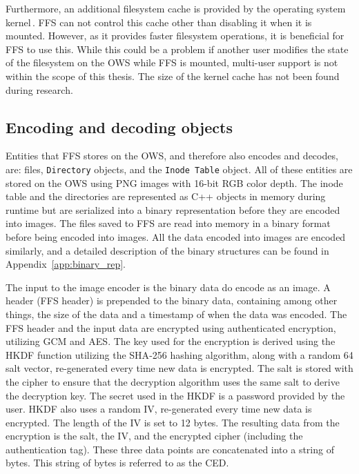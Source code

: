 Furthermore, an additional filesystem cache is provided by the operating system kernel\,\cite{fleischerMountOptionsOsxfuse2020, gowdappaExperiencesFUSEReal2019}. \gls{FFS} can not control this cache other than disabling it when it is mounted. However, as it provides faster filesystem operations, it is beneficial for \gls{FFS} to use this. While this could be a problem if another user modifies the state of the filesystem on the \gls{OWS} while \gls{FFS} is mounted, \mbox{multi-user} support is not within the scope of this thesis. The size of the kernel cache has not been found during research.

\subsection{Encoding and decoding objects}
\label{subsec:file_enc_dec}
Entities that \gls{FFS} stores on the \gls{OWS}, and therefore also encodes and decodes, are: files, \texttt{Directory} objects, and the \texttt{Inode Table} object. All of these entities are stored on the \gls{OWS} using PNG images with \mbox{16-bit} \gls{RGB} color depth. The inode table and the directories are represented as C++ objects in memory during runtime but are serialized into a binary representation before they are encoded into images. The files saved to \gls{FFS} are read into memory in a binary format before being encoded into images. All the data encoded into images are encoded similarly, and a detailed description of the binary structures can be found in Appendix~\ref{app:binary_rep}. 

The input to the image encoder is the binary data do encode as an image. A header (\gls{FFS} header) is prepended to the binary data, containing among other things, the size of the data and a timestamp of when the data was encoded. The \gls{FFS} header and the input data are encrypted using authenticated encryption, utilizing \gls{GCM} and \gls{AES}. The key used for the encryption is derived using the \gls{HKDF} function utilizing the \gls{SHA}-256 hashing algorithm, along with a random \SI{64}{\byte} salt vector, \mbox{re-generated} every time new data is encrypted. The salt is stored with the cipher to ensure that the decryption algorithm uses the same salt to derive the decryption key. The secret used in the \gls{HKDF} is a password provided by the user. \gls{HKDF} also uses a random \gls{IV}, \mbox{re-generated} every time new data is encrypted. The length of the \gls{IV} is set to 12 bytes. The resulting data from the encryption is the salt, the \gls{IV}, and the encrypted cipher (including the authentication tag). These three data points are concatenated into a string of bytes. This string of bytes is referred to as the \gls{CED}.

